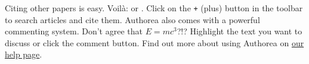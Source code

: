 Citing other papers is easy. Voilà: \cite{2012} or \cite{Holstein_2009}. Click on the \verb|+| (plus) button in the toolbar to search articles and cite them. Authorea also comes with a powerful commenting system. Don't agree that $E  =  mc^{3}$?!? Highlight the text you want to discuss or click the comment button. Find out more about using Authorea on \href{https://www.authorea.com/help}{our help page}.
